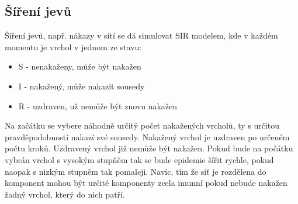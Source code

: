 \documentclass[a4paper,12pt]{article}
\begin{document}
\subsection{Šíření jevů}
Šíření jevů, např. nákazy v sítí se dá simulovat SIR modelem, kde v každém momentu je vrchol v jednom ze stavu:
\begin{itemize}
    \item S - nenakaženy, může být nakažen
    \item I - nakažený, může nakazit sousedy
    \item R - uzdraven, už nemůže být znovu nakažen
\end{itemize}

Na začátku se vybere náhodně určitý počet nakažených vrcholů, ty s určitou pravděpodobností nakazí své sousedy. Nakažený vrchol je uzdraven po určeném počtu kroků.
Uzdravený vrchol již nemůže být nakažen. Pokud bude na počátku vybrán vrchol s vysokým stupňěm tak se bude epidemie šířit rychle, pokud naopak s nizkým stupněm tak pomaleji.
Navíc, tím že síť je rozdělena do komponent mohou být určité komponenty zcela imunní pokud nebude nakažen žadný vrchol, který do nich patří.



\end{document}
